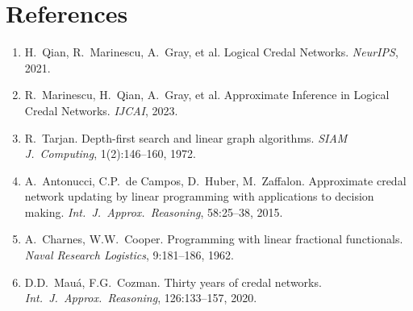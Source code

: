 \documentclass[11pt]{article}
\begin{document}
\section*{References}
\begin{enumerate}
  \item H.\ Qian, R.\ Marinescu, A.\ Gray, et al. Logical Credal Networks.
        \emph{NeurIPS}, 2021.
  \item R.\ Marinescu, H.\ Qian, A.\ Gray, et al. Approximate Inference in
        Logical Credal Networks. \emph{IJCAI}, 2023.
  \item R.\ Tarjan. Depth-first search and linear graph algorithms.
        \emph{SIAM J.\ Computing}, 1(2):146--160, 1972.
  \item A.\ Antonucci, C.P.\ de Campos, D.\ Huber, M.\ Zaffalon. Approximate
        credal network updating by linear programming with applications to
        decision making. \emph{Int.\ J.\ Approx.\ Reasoning}, 58:25--38, 2015.
  \item A.\ Charnes, W.W.\ Cooper. Programming with linear fractional
        functionals. \emph{Naval Research Logistics}, 9:181--186, 1962.
  \item D.D.\ Mau\'a, F.G.\ Cozman. Thirty years of credal networks.
        \emph{Int.\ J.\ Approx.\ Reasoning}, 126:133--157, 2020.
\end{enumerate}
\end{document}
